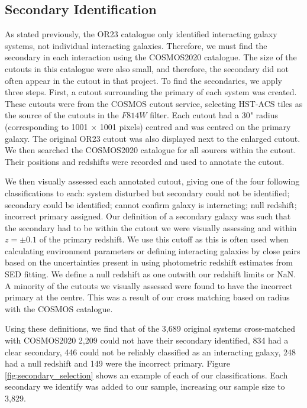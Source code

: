 \documentclass[fleqn,usenatbib]{mnras}
\begin{document}
\subsection{Secondary Identification}\label{sec:sec-ident}
\noindent As stated previously, the OR23 catalogue only identified interacting galaxy systems, not individual interacting galaxies. Therefore, we must find the secondary in each interaction using the COSMOS2020 catalogue. The size of the cutouts in this catalogue were also small, and therefore, the secondary did not often appear in the cutout in that project. To find the secondaries, we apply three steps. First, a cutout surrounding the primary of each system was created. These cutouts were from the COSMOS cutout service, selecting HST-ACS tiles as the source of the cutouts in the $F814W$ filter. Each cutout had a 30" radius (corresponding to 1001 $\times$ 1001 pixels) centred and was centred on the primary galaxy. The original OR23 cutout was also displayed next to the enlarged cutout. We then searched the COSMOS2020 catalogue for all sources within the cutout. Their positions and redshifts were recorded and used to annotate the cutout.

We then visually assessed each annotated cutout, giving one of the four following classifications to each: system disturbed but secondary could not be identified; secondary could be identified; cannot confirm galaxy is interacting; null redshift; incorrect primary assigned. Our definition of a secondary galaxy was such that the secondary had to be within the cutout we were visually assessing and within $z=\pm0.1$ of the primary redshift. We use this cutoff as this is often used when calculating environment parameters \citep[e.g][]{2006MNRAS.373..469B} or defining interacting galaxies by close pairs \citep[e.g][]{2022ApJ...940....4S} based on the uncertainties present in using photometric redshift estimates from SED fitting. We define a null redshift as one outwith our redshift limits or NaN. A minority of the cutouts we visually assessed were found to have the incorrect primary at the centre. This was a result of our cross matching based on radius with the COSMOS catalogue. 

Using these definitions, we find that of the 3,689 original systems cross-matched with COSMOS2020 2,209 could not have their secondary identified, 834 had a clear secondary, 446 could not be reliably classified as an interacting galaxy, 248 had a null redshift and 149 were the incorrect primary. Figure \ref{fig:secondary_selection} shows an example of each of our classifications. Each secondary we identify was added to our sample, increasing our sample size to 3,829.
\end{document}
